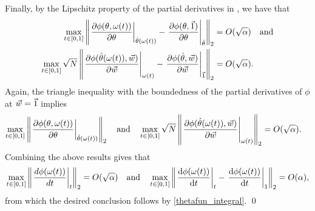 Finally, by the Lipschitz property of the partial derivatives in
, we have that
%
\begin{align*}
%
\max_{t \in [0,1]} \vnorm{
    \fracat{\partial \thetafun(\theta, \omega(t))}
           {\partial \theta}{\thetahat(\omega(t))} -
   \fracat{\partial \thetafun(\theta, \onevec)}
          {\partial \theta}{\thetahat}
}_2
={}& O(\sqrt{\alpha}) \quad \textrm{and}\\
%
\max_{t \in [0,1]} \sqrt{N} \vnorm{
    \fracat{\partial \thetafun(\thetahat(\omega(t)), \w)}
           {\partial \w}{\omega(t)} -
    \fracat{\partial \thetafun(\thetahat, \w)}
           {\partial \w}{\onevec}
}_2 ={}& O(\sqrt{\alpha}).
%
\end{align*}
%
Again, the triangle inequality with the boundedness of the partial
derivatives of $\phi$ at $\vec{w} = \vec{1}$ implies
%
\begin{align*}
%
\max_{t \in [0,1]} \vnorm{
    \fracat{\partial \thetafun(\theta, \omega(t))}
           {\partial \theta}{\thetahat(\omega(t))}
}_2 \quad\textrm{and}\quad
\max_{t \in [0,1]} \sqrt{N} \vnorm{
    \fracat{\partial \thetafun(\thetahat(\omega(t)), \w)}
           {\partial \w}{\omega(t)}
}_2
={}& O(\sqrt{\alpha}).
%
\end{align*}
%
Combining the above results gives that
%
\begin{align*}
%
\max_{t \in [0,1]} \vnorm{\fracat{d \thetafun(\omega(t))}{d t}{t}}_2
= O(\sqrt{\alpha})
\quad\textrm{and}\quad
\max_{t \in [0,1]} \vnorm{
    \fracat{\dee \thetafun(\omega(t))}{\dee t}{t} -
    \fracat{\dee \thetafun(\omega(t))}{\dee t}{1}
}_2  = O(\alpha),
%
\end{align*}
%
from which the desired conclusion follows by \eqref{thetafun_integral}.
%
\qed


